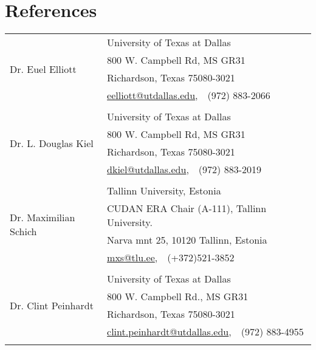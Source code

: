 \documentclass[a4paper,10pt]{article}
\begin{document}
\section{References}
\begin{tabular}{ll}
 \multirow{4}{*}{Dr. Euel Elliott} & University of Texas at Dallas \\ 
& 800 W. Campbell Rd, MS GR31\\
& Richardson, Texas 75080-3021\\
& \href{mailto:eelliott@utdallas.edu}{eelliott@utdallas.edu},~~(972) 883-2066\\
&\\


 \multirow{4}{*}{Dr. L. Douglas Kiel} & University of Texas at Dallas \\ 
& 800 W. Campbell Rd, MS GR31\\
& Richardson, Texas 75080-3021\\
& \href{mailto:dkiel@utdallas.edu}{dkiel@utdallas.edu},~~(972)  883-2019\\
&\\


\multirow{4}{*}{Dr. Maximilian Schich} & Tallinn University, Estonia\\
&CUDAN ERA Chair (A-111), Tallinn University.\\
& Narva mnt 25, 10120 Tallinn, Estonia\\ 
& \href{mailto:mxs@tlu.ee}{mxs@tlu.ee},~~(+372)521-3852\\
&\\


\multirow{4}{*}{Dr. Clint Peinhardt} & University of Texas at Dallas \\ 
& 800 W. Campbell Rd., MS GR31\\
& Richardson, Texas 75080-3021\\
& \href{mailto:clint.peinhardt@utdallas.edu}{clint.peinhardt@utdallas.edu},~~(972) 883-4955\\
&\\
\hline
\end{tabular}
\end{document}
